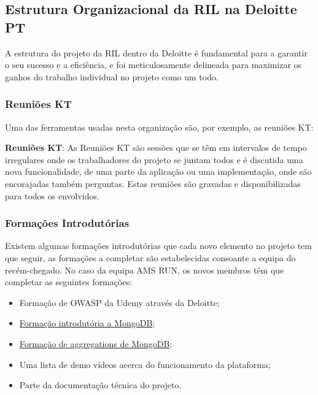     \subsection{Estrutura Organizacional da RIL na Deloitte PT}\label{sec:estrutura-organizacional-da-ril-na-deloitte-PT}

        A estrutura do projeto da RIL dentro da Deloitte é fundamental para a garantir o seu sucesso e a eficiência, e foi meticulosamente delineada para maximizar os ganhos do trabalho individual no projeto como um todo. 

        \subsubsection{Reuniões KT}

            Uma das ferramentas usadas nesta organização são, por exemplo, as reuniões KT:
            
            \textbf{Reuniões KT}: As Reuniões KT são sessões que se têm em intervalos de tempo irregulares onde os trabalhadores do projeto se juntam todos e é discutida uma nova funcionalidade, de uma parte da aplicação ou uma implementação, onde são encorajadas também perguntas. Estas reuniões são gravadas e disponibilizadas para todos os envolvidos. 

        \subsubsection{Formações Introdutórias}\label{formacoes_introdutorias_empresa_cliente}

            Existem algumas formações introdutórias que cada novo elemento no projeto tem que seguir, as formações a completar são estabelecidas consoante a equipa do recém-chegado. No caso da equipa AMS RUN, os novos membros têm que completar as seguintes formações:
            \begin{itemize}
                \item Formação de OWASP da Udemy através da Deloitte;
                \item \href{https://learn.mongodb.com/learning-paths/introduction-to-mongodb}{Formação introdutória a MongoDB};
                \item \href{https://learn.mongodb.com/courses/mongodb-aggregation}{Formação de aggregations de MongoDB};
                \item Uma lista de demo vídeos acerca do funcionamento da plataforma;
                \item Parte da documentação técnica do projeto.
            \end{itemize}

